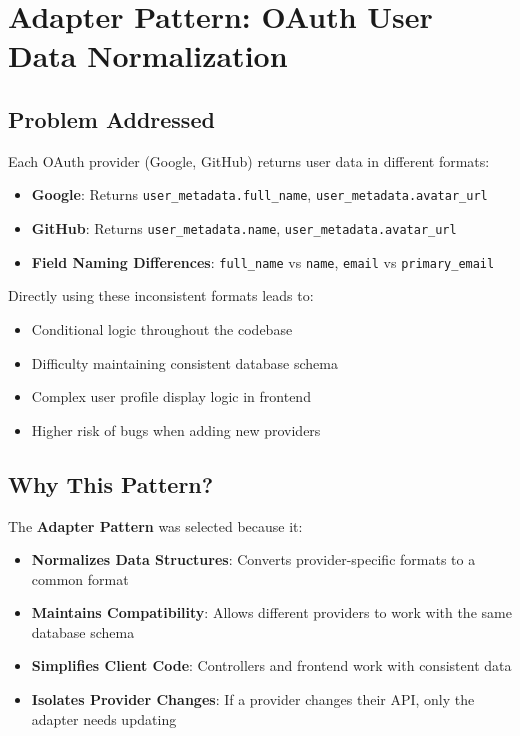 \documentclass[a4paper,12pt]{report}
\begin{document}
\section{Adapter Pattern: OAuth User Data Normalization}

\subsection{Problem Addressed}

Each OAuth provider (Google, GitHub) returns user data in different formats:

\begin{itemize}
    \item \textbf{Google}: Returns \texttt{user\_metadata.full\_name}, \texttt{user\_metadata.avatar\_url}
    \item \textbf{GitHub}: Returns \texttt{user\_metadata.name}, \texttt{user\_metadata.avatar\_url}
    \item \textbf{Field Naming Differences}: \texttt{full\_name} vs \texttt{name}, \texttt{email} vs \texttt{primary\_email}
\end{itemize}

Directly using these inconsistent formats leads to:
\begin{itemize}
    \item Conditional logic throughout the codebase
    \item Difficulty maintaining consistent database schema
    \item Complex user profile display logic in frontend
    \item Higher risk of bugs when adding new providers
\end{itemize}

\subsection{Why This Pattern?}

The \textbf{Adapter Pattern} was selected because it:

\begin{itemize}
    \item \textbf{Normalizes Data Structures}: Converts provider-specific formats to a common format
    \item \textbf{Maintains Compatibility}: Allows different providers to work with the same database schema
    \item \textbf{Simplifies Client Code}: Controllers and frontend work with consistent data
    \item \textbf{Isolates Provider Changes}: If a provider changes their API, only the adapter needs updating
\end{itemize}
\end{document}
